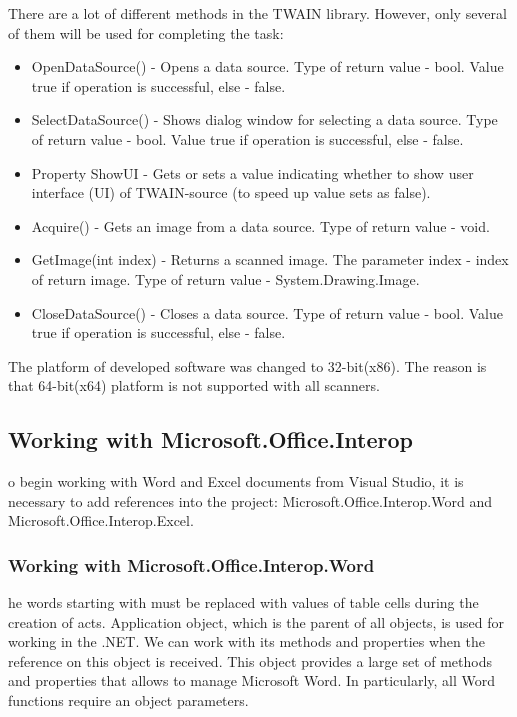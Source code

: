 \documentclass[12pt,journal,compsoc]{D:/Магистратура/English/bare_conf/IEEEtran}
\begin{document}
There are a lot of different methods in the TWAIN library. However, only several of them will be used for completing the task:
\begin{itemize}
\item OpenDataSource() - Opens a data source. Type of return value - bool. Value true if operation is successful, else - false.
\item SelectDataSource() - Shows dialog window for selecting a data source. Type of return value - bool. Value true if operation is successful, else - false.
\item Property ShowUI - Gets or sets a value indicating whether to show user interface (UI) of TWAIN-source (to speed up value sets as false).
\item Acquire() - Gets an image from a data source. Type of return value - void.
\item GetImage(int index) - Returns a scanned image. The parameter index - index of return image. Type of return value - System.Drawing.Image.
\item CloseDataSource() - Closes a data source. Type of return value - bool. Value true if operation is successful, else - false.
\end{itemize}

The platform of developed software was changed to 32-bit(x86). The reason is that 64-bit(x64) platform is not supported with all scanners.

\subsection{Working with Microsoft.Office.Interop}
o begin working with Word and Excel documents from Visual Studio, it is necessary to add references into the project: Microsoft.Office.Interop.Word and Microsoft.Office.Interop.Excel.

\subsubsection{Working with Microsoft.Office.Interop.Word}
he words starting with \@ must be replaced with values of table cells during the creation of acts. Application object, which is the parent of all objects, is used for working in the .NET. We can work with its methods and properties when the reference on this object is received. This object provides a large set of methods and properties that allows to manage  Microsoft Word. In particularly, all Word functions require an object parameters.
\end{document}
